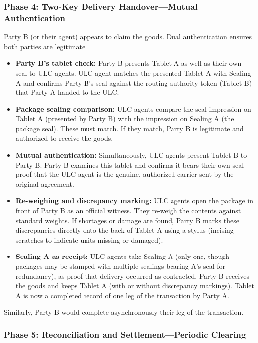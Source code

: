 \documentclass[12pt]{article}
\begin{document}
\subsubsection{Phase 4: Two-Key Delivery Handover—Mutual Authentication}

Party B (or their agent) appears to claim the goods. Dual authentication
ensures both parties are legitimate:

\begin{itemize}
\item \textbf{Party B's tablet check:} Party B presents Tablet A as well
as their own seal to ULC agents. ULC agent matches the presented Tablet A
with Sealing A and confirms Party B's seal against the routing authority token
(Tablet B) that Party A handed to the ULC.

\item \textbf{Package sealing comparison:} ULC agents compare the seal
impression on Tablet A (presented by Party B) with the impression on
Sealing A (the package seal). These must match. If they match, Party B
is legitimate and authorized to receive the goods.

\item \textbf{Mutual authentication:} Simultaneously, ULC agents present
Tablet B to Party B. Party B examines this tablet and confirms it bears
their own seal—proof that the ULC agent is the genuine, authorized carrier
sent by the original agreement.

\item \textbf{Re-weighing and discrepancy marking:} ULC agents open the
package in front of Party B as an official witness. They re-weigh the
contents against standard weights. If shortages or damage are found,
Party B marks these discrepancies directly onto the back of Tablet A
using a stylus (incising scratches to indicate units missing or damaged).

\item \textbf{Sealing A as receipt:} ULC agents take Sealing A (only
one, though packages may be stamped with multiple sealings bearing A's seal for
redundancy), as proof that delivery occurred as contracted. Party B
receives the goods and keeps Tablet A (with or without discrepancy markings).
Tablet A is now a completed record of one leg of the transaction by Party A.
\end{itemize}

Similarly, Party B would complete asynchronously their leg of the transaction.

\subsubsection{Phase 5: Reconciliation and Settlement—Periodic Clearing}
\end{document}
